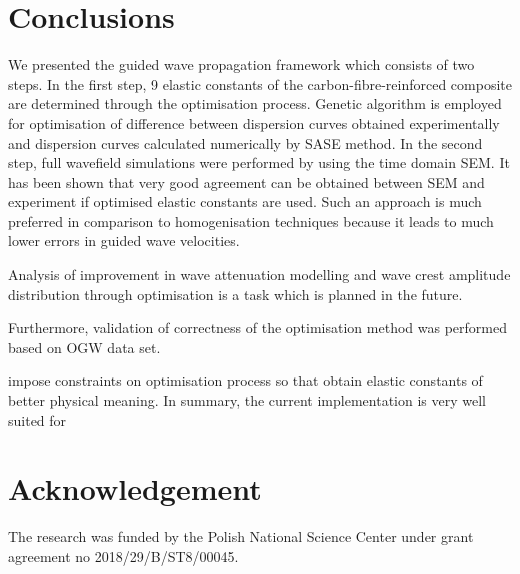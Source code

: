 \documentclass[preprint,12pt]{elsarticle}
\begin{document}
\section{Conclusions}
We presented the guided wave propagation framework which consists of two steps. 
In the first step, 9 elastic constants of the carbon-fibre-reinforced composite are determined through the optimisation process. 
Genetic algorithm is employed for optimisation of difference between dispersion curves obtained experimentally and dispersion curves calculated numerically by SASE method.
In the second step, full wavefield simulations were performed by using the time domain SEM. 
It has been shown that very good agreement can be obtained between SEM and experiment if optimised elastic constants are used. 
Such an approach is much preferred in comparison to homogenisation techniques because it leads to much lower errors in guided wave velocities.

Analysis of improvement in wave attenuation modelling and wave crest amplitude distribution through optimisation is a task which is planned in the future.

Furthermore, validation of correctness of the optimisation method was performed based on OGW data set.

 
	impose constraints on optimisation process so that obtain elastic constants of better physical meaning.
	In summary, the current implementation is very well suited for 
	 
	 
	\section*{Acknowledgement}
   The research was funded by the Polish National Science Center under grant agreement no 2018/29/B/ST8/00045. 
	
	
	
	
    
	{}
\end{document}
